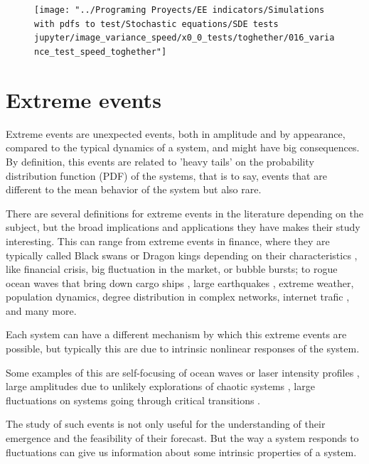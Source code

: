 \begin{figure}
	\centering
	\texttt{[image: "../Programing Proyects/EE indicators/Simulations with pdfs to test/Stochastic equations/SDE tests jupyter/image\_variance\_speed/x0\_0\_tests/toghether/016\_variance\_test\_speed\_toghether"]}
	\caption{}
	\label{fig:016variancetestspeedtoghether}
\end{figure}



\section{Extreme events}

Extreme events are unexpected events, both in amplitude and by appearance, compared to the typical dynamics of a system, and might have big consequences. 
By definition,  this events are related to 'heavy tails' on the probability distribution function (PDF) of the systems, that is to say, events that are different to the mean behavior of the system but also rare. 

There are several definitions for extreme events in the literature depending on the subject, but the broad implications and applications they have makes their study interesting. 
This  can range from  extreme events in finance, where they are typically called Black swans or Dragon kings depending on their characteristics \cite{..}, like financial crisis, big fluctuation in the market\cite{bibid}, or bubble bursts\cite{bibid}; to rogue ocean waves that bring down cargo ships \cite{..}, large earthquakes \cite{bibid}, extreme weather\cite{bibid}, population dynamics\cite{bibid}, degree distribution in complex networks\cite{Eom2015}, internet trafic \cite{Hernandez-Campos},  and many more.

Each system can have a different mechanism by which this extreme events are possible, but typically this are due to intrinsic nonlinear responses of the system. 

Some examples of this are self-focusing of ocean waves\cite{..} or laser intensity profiles \cite{..}, large amplitudes due to unlikely explorations of chaotic systems \cite{..}, large fluctuations on systems going through critical transitions \cite{..}.

The study of such events is not only useful for the understanding of their emergence and the feasibility of their forecast. 
But the way a system responds to fluctuations can give us information about some intrinsic properties of a system. 



